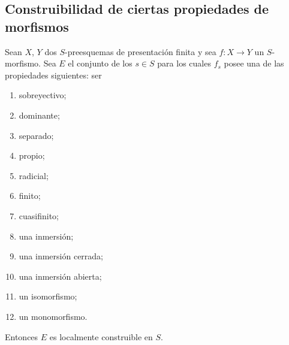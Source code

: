 \subsection{Construibilidad de ciertas propiedades de morfismos}
\label{subsection:IV.9.6}

\begin{proposition}[9.6.1]
\label{IV.9.6.1}
Sean $X$, $Y$ dos $S$-preesquemas de presentación finita y sea $f:X\to Y$ un $S$-morfismo.
Sea $E$ el conjunto de los $s\in S$ para los cuales $f_s$ posee una de las propiedades siguientes: ser
\begin{enumerate}[label=\textup{(\roman*)},widest=xii]
  \item sobreyectivo;
  \item dominante;
  \item separado;
  \item propio;
  \item radicial;
  \item finito;
  \item cuasifinito;
  \item una inmersión;
  \item una inmersión cerrada;
  \item una inmersión abierta;
  \item un isomorfismo;
  \item un monomorfismo.
\end{enumerate}
Entonces $E$ es localmente construible en $S$.
\end{proposition}

